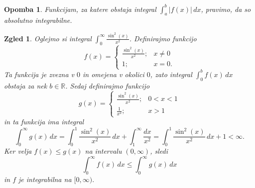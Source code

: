 \documentclass[10pt, a4paper]{article}
\newtheorem*{opomba}{Opomba}
\newtheorem{zgled}[izr]{Zgled}
\newcommand{\R}{\mathbb {R}}
\begin{document}
\begin{opomba}
    Funkcijam, za katere obstaja integral $\int_a ^b |f(x)|\,dx$, pravimo, da so absolutno integrabilne.
\end{opomba}

\begin{zgled}
        Oglejmo si integral $\int_0 ^\infty \frac{\sin ^2 (x)}{x^2}$. 
        Definirajmo funkcijo $$f(x) = \begin{cases}
            \frac{\sin ^2 (x)}{x^2} ;& x \neq 0\\
            1 ;& x= 0.
        \end{cases}$$
        Ta funkcija je zvezna v $0$ in omejena v okolici $0$, zato integral $\int _0 ^b f(x)\,dx$ obstaja za nek $b \in \R$.
        Sedaj definirajmo funkcijo 
        $$g(x) = \begin{cases}
            \frac{\sin ^2 (x)}{x^2} ;& 0 < x < 1\\
            \frac{1}{x^2} ;& x > 1
        \end{cases}$$ in ta funkcija ima integral $$\int_0 ^\infty g(x)\,dx = \int_0 ^1 \frac{\sin ^2 (x)}{x^2}\,dx + \int_1 ^\infty \frac{dx}{x^2} = \int_0 ^1 \frac{\sin ^2 (x)}{x^2}\,dx + 1 < \infty.$$ 
        Ker velja $f(x) \leq g(x)$ na intervalu $(0, \infty)$, sledi 
        $$\int_0 ^\infty f(x)\,dx \leq \int_0 ^\infty g(x)\,dx$$ in $f$ je integrabilna na $[0, \infty).$
\end{zgled}
\end{document}
